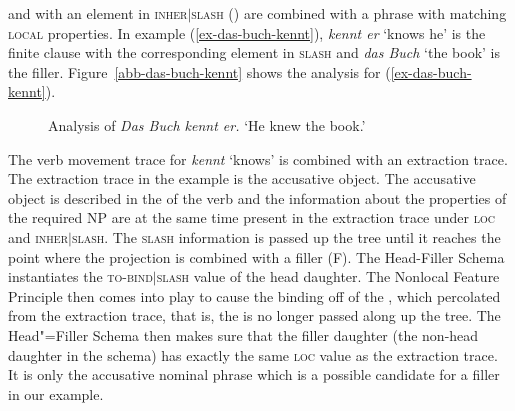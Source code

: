 {{and with an element in \textsc{inher$|$slash} () are combined with a phrase with matching \textsc{local} properties.
In example (\ref{ex-das-buch-kennt}), \emph{kennt er} `knows he' is the finite clause with the corresponding element in \textsc{slash}
and \emph{das Buch} `the book' is the filler. Figure~\vref{abb-das-buch-kennt} shows the analysis for (\ref{ex-das-buch-kennt}).
\begin{figure}
\caption{Analysis of \emph{Das Buch kennt er.} `He knew the book.'}\label{abb-das-buch-kennt}
\end{figure}


The verb movement trace for \emph{kennt} `knows' is combined with an extraction trace. 
The extraction trace in the example is the accusative object. The accusative object 
is described in the \compsl of the verb and the information about the properties
of the required NP are at the same time present in the extraction trace under \textsc{loc}
and \textsc{inher$|$slash}. The \textsc{slash} information is passed up the tree until it reaches
the point where the projection is combined with a filler (F). The Head-Filler Schema instantiates
the \textsc{to-bind$|$slash} value of the head daughter. The Nonlocal Feature Principle then comes into
play to cause the binding off of the \slashv, which percolated from the extraction trace, that is, the \slashv is no longer passed
along up the tree. The Head"=Filler Schema then makes sure that the filler daughter (the non-head daughter
in the schema) has exactly the same \textsc{loc} value as the extraction trace. It is only the accusative nominal
phrase which is a possible candidate for a filler in our example.


}}

